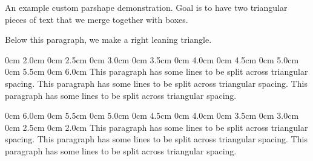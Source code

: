 

An example custom parshape demonstration.  Goal is to have two triangular pieces of text that
we merge together with boxes.

\def\leftitem#1{\item{\hbox to\parindent{\enspace#1\hfill}}}


Below this paragraph, we make a right leaning triangle.

{} 0cm 2.0cm%
0cm 2.5cm%
0cm 3.0cm%
0cm 3.5cm%
0cm 4.0cm%
0cm 4.5cm%
0cm 5.0cm%
0cm 5.5cm%
0cm 6.0cm%
This paragraph has some lines to be split across triangular spacing.
This paragraph has some lines to be split across triangular spacing.
This paragraph has some lines to be split across triangular spacing.

 0cm 6.0cm%
0cm 5.5cm%
0cm 5.0cm%
0cm 4.5cm%
0cm 4.0cm%
0cm 3.5cm%
0cm 3.0cm%
0cm 2.5cm%
0cm 2.0cm%
This paragraph has some lines to be split across triangular spacing.
This paragraph has some lines to be split across triangular spacing.
This paragraph has some lines to be split across triangular spacing.


\bye

